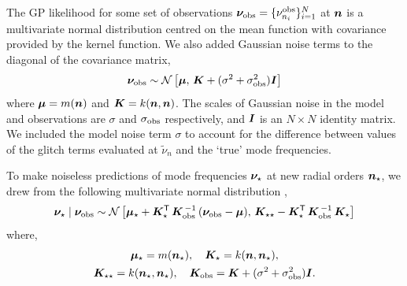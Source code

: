 The GP likelihood for some set of observations \(\bm{\nu}_{{\mathrm{obs}}} = \{\nu_{n_i}^{{\mathrm{obs}}}\}_{i=1}^N\) at \(\bm{n}\) is a multivariate normal distribution centred on the mean function with covariance provided by the kernel function. We also added Gaussian noise terms to the diagonal of the covariance matrix,
%
\begin{equation}
    \bm{\nu}_{{\mathrm{obs}}} \sim \mathcal{N}\left[ \bm{\mu}, \, \bm{K} + (\sigma^2 + \sigma_{{\mathrm{obs}}}^2) \bm{I} \right] \label{eq:gp-like}
\end{equation}
%
where \(\bm{\mu} = m(\bm{n})\) and \(\bm{K} = k(\bm{n}, \bm{n})\). The scales of Gaussian noise in the model and observations are \(\sigma\) and \(\sigma_{{\mathrm{obs}}}\) respectively, and \(\bm{I}\) is an \(N \times N\) identity matrix. We included the model noise term \(\sigma\) to account for the difference between values of the glitch terms evaluated at \(\tilde{\nu}_n\) and the `true' mode frequencies.

To make noiseless predictions of mode frequencies \(\bm{\nu}_\star\) at new radial orders \(\bm{n}_\star\), we drew from the following multivariate normal distribution ,
%
\begin{equation}
    \bm{\nu}_\star \mid \bm{\nu}_{{\mathrm{obs}}} \sim \mathcal{N} \left[ \bm{\mu}_\star + \bm{K}_\star^\mathsf{T} \, \bm{K}_{{\mathrm{obs}}}^{\,-1} \, (\bm{\nu}_{{\mathrm{obs}}} - \bm{\mu}), \, \bm{K}_{\star\star} - \bm{K}_\star^\mathsf{T} \, \bm{K}_{{\mathrm{obs}}}^{\,-1} \, \bm{K}_\star \right]
\end{equation}
%
where,
%
\begin{gather*}
    \bm{\mu}_\star = m(\bm{n}_\star), \quad \bm{K}_\star = k(\bm{n}, \bm{n}_\star),\\
    \bm{K}_{\star\star} = k(\bm{n}_\star, \bm{n}_\star), \quad \bm{K}_{{\mathrm{obs}}} = \bm{K} + (\sigma^2 + \sigma_{{\mathrm{obs}}}^2) \bm{I}.
\end{gather*}
%

